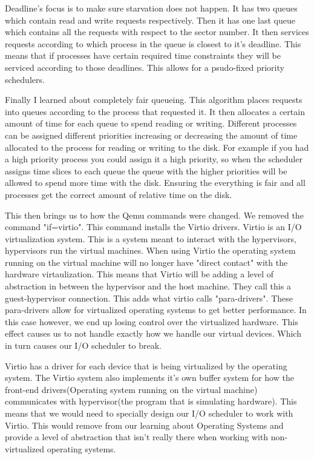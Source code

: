 \documentclass[onecolumn, draftclsnofoot,10pt, compsoc]{IEEEtran}
\begin{document}
            Deadline's focus is to make sure starvation does not happen. It has two queues which contain read and write requests respectively. Then it has one last queue which contains all the requests with respect to the sector number. It then services requests according to which process in the queue is closest to it's deadline. This means that if processes have certain required time constraints they will be serviced according to those deadlines. This allows for a psudo-fixed priority schedulers. 
            
            Finally I learned about completely fair queueing. This algorithm places requests into queues according to the process that requested it. It then allocates a certain amount of time for each queue to spend reading or writing. Different processes can be assigned different priorities increasing or decreasing the amount of time allocated to the process for reading or writing to the disk. For example if you had a high priority process you could assign it a high priority, so when the scheduler assigns time slices to each queue the queue with the higher priorities will be allowed to spend more time with the disk. Ensuring the everything is fair and all processes get the correct amount of relative time on the disk.
            
            This then brings us to how the Qemu commands were changed. We removed the command "if=virtio". This command installs the Virtio drivers. Virtio is an I/O virtualization system. This is a system meant to interact with the hypervisors, hypervisors run the virtual machines. When using Virtio the operating system running on the virtual machine will no longer have "direct contact" with the hardware virtaulization. This means that Virtio will be adding a level of abstraction in between the hypervisor and the host machine. They call this a guest-hypervisor connection. This adds what virtio calls "para-drivers". These para-drivers allow for virtualized operating systems to get better performance. In this case however, we end up losing control over the virtualized hardware. This effect causes us to not handle exactly how we handle our virtual devices. Which in turn causes our I/O scheduler to break.
            
            Virtio has a driver for each device that is being virtualized by the operating system. The Virtio system also implements it's own buffer system for how the front-end drivers(Operating system running on the virtual machine) communicates with hypervisor(the program that is simulating hardware). This means that we would need to specially design our I/O scheduler to work with Virtio. This would remove from our learning about Operating Systems and provide a level of abstraction that isn't really there when working with non-virtualized operating systems.
            
\end{document}
